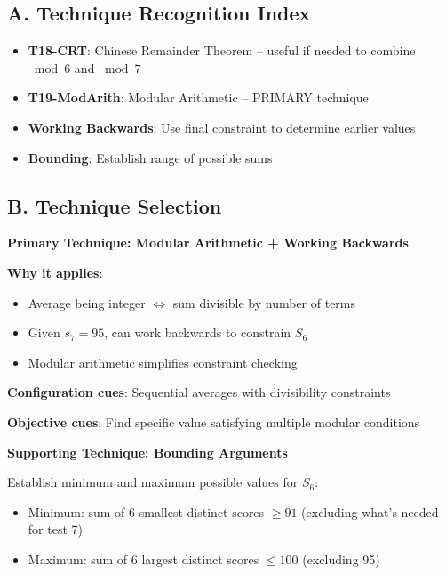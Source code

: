 \documentclass[11pt]{article}
\begin{document}
\begin{techniquesbox}
\subsection*{A. Technique Recognition Index}
\begin{itemize}[leftmargin=*]
    \item \textbf{T18-CRT}: Chinese Remainder Theorem -- useful if needed to combine $\bmod 6$ and $\bmod 7$
    \item \textbf{T19-ModArith}: Modular Arithmetic -- PRIMARY technique
    \item \textbf{Working Backwards}: Use final constraint to determine earlier values
    \item \textbf{Bounding}: Establish range of possible sums
\end{itemize}

\subsection*{B. Technique Selection}
\textbf{Primary Technique: Modular Arithmetic + Working Backwards}

\textbf{Why it applies}:
\begin{itemize}
    \item Average being integer $\Leftrightarrow$ sum divisible by number of terms
    \item Given $s_7 = 95$, can work backwards to constrain $S_6$
    \item Modular arithmetic simplifies constraint checking
\end{itemize}

\textbf{Configuration cues}: Sequential averages with divisibility constraints

\textbf{Objective cues}: Find specific value satisfying multiple modular conditions

\textbf{Supporting Technique: Bounding Arguments}

Establish minimum and maximum possible values for $S_6$:
\begin{itemize}
    \item Minimum: sum of 6 smallest distinct scores $\geq 91$ (excluding what's needed for test 7)
    \item Maximum: sum of 6 largest distinct scores $\leq 100$ (excluding 95)
\end{itemize}


\end{techniquesbox}
\end{document}
